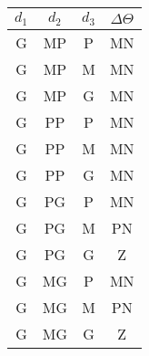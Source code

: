 \begin{table}[H]
\begin{minipage}{0.30\textwidth}
\begin{tabular}{| c | c | c | c |}
						\end{tabular}	
					\end{minipage}	
					\begin{minipage}{0.30\textwidth}
					    \centering
						\begin{tabular}{| c | c | c | c |} 
						\hline
						\(d_1\) & \(d_2\) & \(d_3\) & \(\Delta \Theta\) \\ \hline
						G & MP & P & MN \\ \hline
						G & MP & M & MN \\ \hline
						G & MP & G & MN \\ \hline
						G & PP & P & MN \\ \hline
						G & PP & M & MN \\ \hline
						G & PP & G & MN  \\ \hline 	  	
						G & PG & P & MN \\ \hline
						G & PG & M & PN \\ \hline
						G & PG & G & Z  \\ \hline
						G & MG & P & MN \\ \hline
						G & MG & M & PN \\ \hline
						G & MG & G & Z  \\ \hline
						\end{tabular}	
					\end{minipage}	      
			    \end{table}

	
	\FloatBarrier
